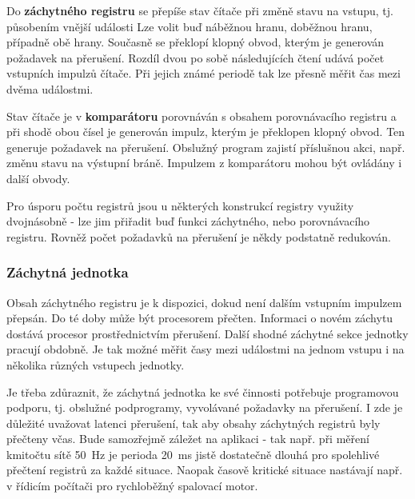       Do \textbf{záchytného registru} se přepíše stav čítače při změně stavu na vstupu, tj. 
      působením vnější události Lze volit buď náběžnou hranu, doběžnou hranu, případně obě hrany. 
      Současně se překlopí klopný obvod, kterým je generován požadavek na přerušení. Rozdíl dvou po 
      sobě následujících čtení udává počet vstupních impulzů čítače. Při jejich známé periodě tak 
      lze přesně měřit čas mezi dvěma událostmi.
      
      Stav čítače je v \textbf{komparátoru} porovnáván s obsahem porovnávacího registru a při shodě 
      obou čísel je generován impulz, kterým je překlopen klopný obvod. Ten generuje požadavek na 
      přerušení. Obslužný program zajistí příslušnou akci, např. změnu stavu na výstupní 
      bráně. Impulzem z komparátoru mohou být ovládány i další obvody.
      
      Pro úsporu počtu registrů jsou u některých konstrukcí registry využity dvojnásobně - lze jim 
      přiřadit buď funkci záchytného, nebo porovnávacího registru. Rovněž počet požadavků na 
      přerušení je někdy podstatně redukován.

      \subsubsection{Záchytná jednotka}
        Obsah záchytného registru je k dispozici, dokud není dalším vstupním impulzem přepsán. Do 
        té doby může být procesorem přečten. Informaci o novém záchytu dostává procesor 
        prostřednictvím přerušení. Další shodné záchytné sekce jednotky pracují obdobně. Je tak 
        možné měřit časy mezi událostmi na jednom vstupu i na několika různých vstupech jednotky.
        
        Je třeba zdůraznit, že záchytná jednotka ke své činnosti potřebuje programovou podporu, tj. 
        obslužné podprogramy, vyvolávané požadavky na přerušení. I zde je důležité uvažovat latenci 
        přerušení, tak aby  obsahy záchytných registrů byly přečteny včas. Bude samozřejmě záležet 
        na aplikaci - tak např. při měření kmitočtu sítě \SI{50}{\hertz} je perioda 
        \SI{20}{\milli\second} jistě dostatečně dlouhá pro spolehlivé přečtení registrů za každé 
        situace. Naopak časově kritické situace nastávají např. v řídicím počítači pro rychloběžný 
        spalovací motor.
        
